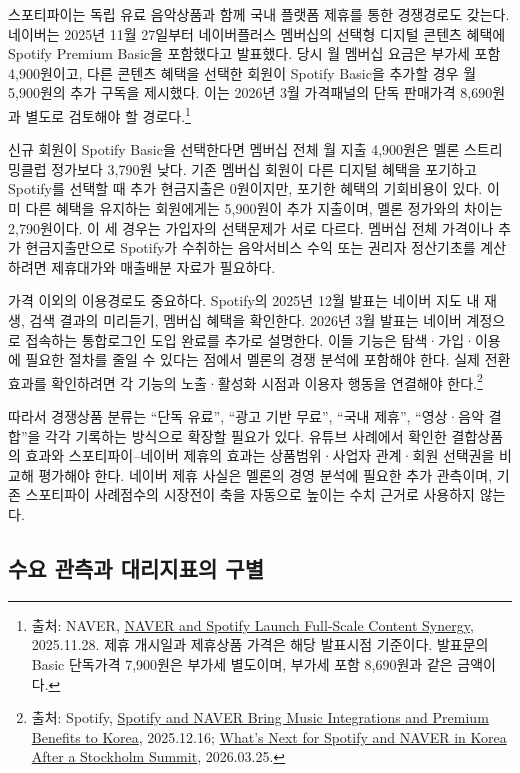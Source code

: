 \documentclass[11pt,a4paper]{report}
\newcommand{\sourcefootnote}[1]{\footnote{출처: #1}}
\begin{document}
스포티파이는 독립 유료 음악상품과 함께 국내 플랫폼 제휴를 통한 경쟁경로도 갖는다. 네이버는 2025년 11월 27일부터 네이버플러스 멤버십의 선택형 디지털 콘텐츠 혜택에 Spotify Premium Basic을 포함했다고 발표했다. 당시 월 멤버십 요금은 부가세 포함 4,900원이고, 다른 콘텐츠 혜택을 선택한 회원이 Spotify Basic을 추가할 경우 월 5,900원의 추가 구독을 제시했다. 이는 2026년 3월 가격패널의 단독 판매가격 8,690원과 별도로 검토해야 할 경로다.\sourcefootnote{NAVER, \href{https://www.navercorp.com/media/pressReleasesDetail?seq=33622}{NAVER and Spotify Launch Full-Scale Content Synergy}, 2025.11.28. 제휴 개시일과 제휴상품 가격은 해당 발표시점 기준이다. 발표문의 Basic 단독가격 7,900원은 부가세 별도이며, 부가세 포함 8,690원과 같은 금액이다.}

신규 회원이 Spotify Basic을 선택한다면 멤버십 전체 월 지출 4,900원은 멜론 스트리밍클럽 정가보다 3,790원 낮다. 기존 멤버십 회원이 다른 디지털 혜택을 포기하고 Spotify를 선택할 때 추가 현금지출은 0원이지만, 포기한 혜택의 기회비용이 있다. 이미 다른 혜택을 유지하는 회원에게는 5,900원이 추가 지출이며, 멜론 정가와의 차이는 2,790원이다. 이 세 경우는 가입자의 선택문제가 서로 다르다. 멤버십 전체 가격이나 추가 현금지출만으로 Spotify가 수취하는 음악서비스 수익 또는 권리자 정산기초를 계산하려면 제휴대가와 매출배분 자료가 필요하다.

가격 이외의 이용경로도 중요하다. Spotify의 2025년 12월 발표는 네이버 지도 내 재생, 검색 결과의 미리듣기, 멤버십 혜택을 확인한다. 2026년 3월 발표는 네이버 계정으로 접속하는 통합로그인 도입 완료를 추가로 설명한다. 이들 기능은 탐색·가입·이용에 필요한 절차를 줄일 수 있다는 점에서 멜론의 경쟁 분석에 포함해야 한다. 실제 전환효과를 확인하려면 각 기능의 노출·활성화 시점과 이용자 행동을 연결해야 한다.\sourcefootnote{Spotify, \href{https://newsroom.spotify.com/2025-12-16/spotify-naver-korea-integration/}{Spotify and NAVER Bring Music Integrations and Premium Benefits to Korea}, 2025.12.16; \href{https://newsroom.spotify.com/2026-03-25/spotify-naver-korea-partnership-update/}{What’s Next for Spotify and NAVER in Korea After a Stockholm Summit}, 2026.03.25.}

따라서 경쟁상품 분류는 ``단독 유료'', ``광고 기반 무료'', ``국내 제휴'', ``영상·음악 결합''을 각각 기록하는 방식으로 확장할 필요가 있다. 유튜브 사례에서 확인한 결합상품의 효과와 스포티파이--네이버 제휴의 효과는 상품범위·사업자 관계·회원 선택권을 비교해 평가해야 한다. 네이버 제휴 사실은 멜론의 경영 분석에 필요한 추가 관측이며, 기존 스포티파이 사례점수의 시장전이 축을 자동으로 높이는 수치 근거로 사용하지 않는다.

\subsection{수요 관측과 대리지표의 구별}
\end{document}
